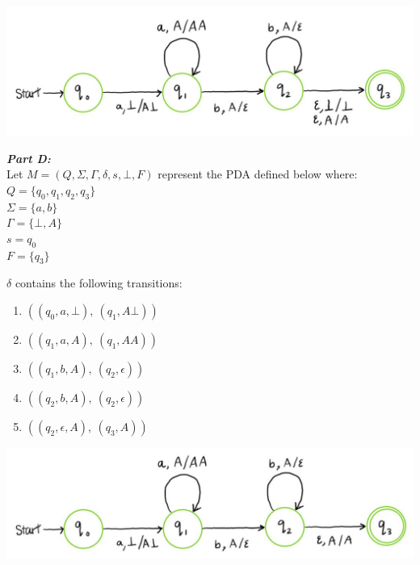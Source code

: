 \documentclass[11pt,fleqn]{article}
\newcommand{\be}{\begin{enumerate}}
\newcommand{\ee}{\end{enumerate}}
\newcommand{\set}[1]{{\{ #1 \}}}
\begin{document}
	\begin{center}
	\includegraphics[scale = 0.5]{A8partC.JPG}
	\end{center}

	\noindent\textbf{\emph{Part D:}}\\
	Let $M = (Q, \Sigma, \Gamma, \delta, s, \bot, F)$ represent the PDA defined below where:\\
	$Q = \set{q_0, q_1, q_2, q_3}$\\
	$\Sigma = \set{a, b}$\\
	$\Gamma = \set{\bot, A}$\\
	$s = q_0$\\
	$F = \set{q_3}$

	\noindent$\delta$ contains the following transitions:
	\be
	\item $((q_0, a, \bot),\ (q_1, A\bot))$
	\item $((q_1, a, A),\ (q_1, AA))$
	\item $((q_1, b, A),\ (q_2, \epsilon))$
	\item $((q_2, b, A),\ (q_2, \epsilon))$
	\item $((q_2, \epsilon, A),\ (q_3, A))$
	\ee
	
	\begin{center}
	\includegraphics[scale = 0.5]{A8partD.JPG}
	\end{center}

	
	
\end{document}
